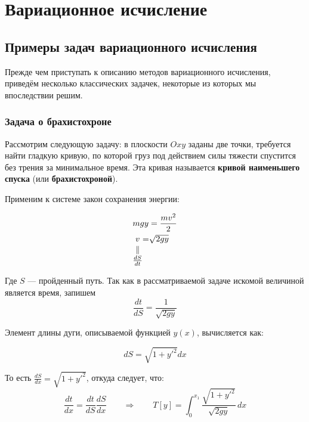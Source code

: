 \documentclass[12pt]{article}
\begin{document}
\section{Вариационное исчисление}

	\subsection{Примеры задач вариационного исчисления}

	Прежде чем приступать к описанию методов вариационного исчисления, приведём несколько классических
	задачек, некоторые из которых мы впоследствии решим.
	
		\subsubsection{Задача о брахистохроне}

			Рассмотрим следующую задачу: в плоскости $Oxy$ заданы две точки, требуется найти гладкую кривую, 
			по которой груз под действием силы тяжести спустится без трения за минимальное время. Эта кривая
			называется \textbf{кривой наименьшего спуска} (или \textbf{брахистохроной}).


			Применим к системе закон сохранения энергии:

			\begin{align*}
				&mgy = \frac{mv^2}{2} \\
				&\begin{CD}
					v @.=@. \sqrt{2gy} @.\\
					\vspace{-27pt}\\
					\parallel @. @. @. \\
					\vspace{-27pt}\\
					\frac{dS}{dt} @. @. @.
				\end{CD}
			\end{align*}

			Где $S$ --- пройденный путь. Так как в рассматриваемой задаче искомой величиной является время,
			запишем $$\frac{dt}{dS} = \frac{1}{\sqrt{2gy}}$$

			Элемент длины дуги, описываемой функцией $y(x)$, вычисляется как:

			$$dS = \sqrt{1 + y'^2} dx$$

			То есть $\frac{dS}{dx} = \sqrt{1 + y'^2}$, откуда следует, что:
			$$\frac{dt}{dx} = \frac{dt}{dS} \frac{dS}{dx} \qquad\Rightarrow\qquad 
				T[y] = \int_0^{x_1} \frac{\sqrt{1+y'^2}}{\sqrt{2gy}} \, dx$$
\end{document}
